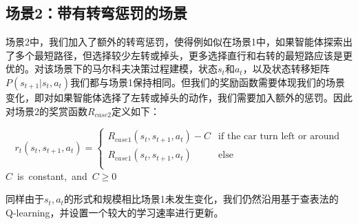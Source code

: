 \documentclass{standalone}
\begin{document}
\subsection{场景2：带有转弯惩罚的场景}
场景2中，我们加入了额外的转弯惩罚，使得例如似在场景1中，如果智能体探索出了多个最短路径，但选择较少左转或掉头，更多选择直行和右转的最短路应该是更优的。对该场景下的马尔科夫决策过程建模，状态$s_t$和$a_t$，以及状态转移矩阵$P(s_{t+1}|s_t, a_t)$我们都与场景1保持相同。但我们的奖励函数需要体现我们的场景变化，即对如果智能体选择了左转或掉头的动作，我们需要加入额外的惩罚。因此对场景2的奖赏函数$R_{case2}$定义如下：
\begin{center}
    \begin{equation}
    \label{eq2reward}
    r_t(s_t, s_{t+1}, a_t) = \begin{cases}
     R_{case1}(s_t, s_{t+1}, a_t) - C &\mbox{if the car turn left or around}\\
     R_{case1}(s_t, s_{t+1}, a_t) &\mbox{else}\\
     \end{cases}
    \end{equation}
   \mbox{$C$ is constant, and $C \geq 0$}

\end{center}
同样由于$s_t, a_t$的形式和规模相比场景1未发生变化，我们仍然沿用基于查表法的 Q-learning，并设置一个较大的学习速率进行更新。
\end{document}
